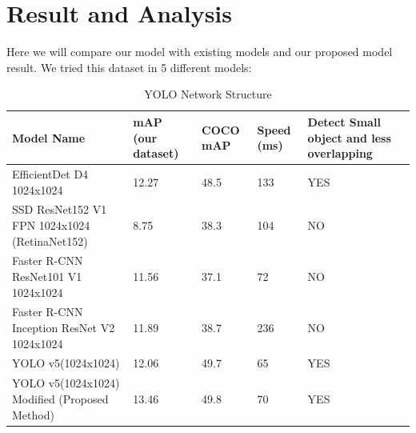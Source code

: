 \chapter[Result and Analysis]{Result and Analysis}

\regularsection
\headerregularsection

\updatemylof %
\updatemylot %

\begin{sloppypar} %
Here we will compare our model with existing models and our proposed model result. We tried this dataset in 5 different models: 
\end{sloppypar}



\begin{table}[!h]
  \centering
  \caption[YOLO Network Structure]{YOLO Network Structure}
  \label{tab:yolo-network}
  {\renewcommand{\arraystretch}{1.7}
      \begin{tabular}{p{4cm} p{1cm} p{0.8cm} p{1cm} p{2.6cm}}
          \toprule
          Model Name                                    & mAP (our dataset) & COCO mAP & Speed (ms) & Detect Small object and less overlapping \\
          \hline
          EfficientDet D4 1024x1024                     & 12.27             & 48.5     & 133        & YES                                      \\
          SSD ResNet152 V1 FPN 1024x1024 (RetinaNet152) & 8.75              & 38.3     & 104        & NO                                       \\
          Faster R-CNN ResNet101 V1 1024x1024           & 11.56             & 37.1     & 72         & NO                                       \\
          Faster R-CNN Inception ResNet V2 1024x1024    & 11.89             & 38.7     & 236        & NO                                       \\
          YOLO v5(1024x1024)                            & 12.06             & 49.7     & 65         & YES                                      \\
          YOLO v5(1024x1024) Modified (Proposed Method) & 13.46             & 49.8     & 70         & YES                                      \\
          \bottomrule
    \end{tabular}
  }
\end{table}

